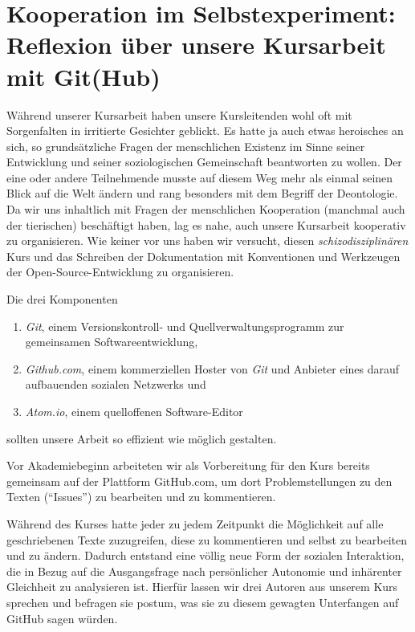 \section[Kursreflexion]{Kooperation im Selbstexperiment: Reflexion über unsere Kursarbeit mit Git(Hub)}

Während unserer Kursarbeit haben unsere Kursleitenden wohl oft mit Sorgenfalten in irritierte Gesichter geblickt.
Es hatte ja auch etwas heroisches an sich, so grundsätzliche Fragen der menschlichen Existenz im Sinne seiner Entwicklung und seiner soziologischen Gemeinschaft beantworten zu wollen.
Der eine oder andere Teilnehmende musste auf diesem Weg mehr als einmal seinen Blick auf die Welt ändern und rang besonders mit dem Begriff der Deontologie.
Da wir uns inhaltlich mit Fragen der menschlichen Kooperation (manchmal auch der tierischen) beschäftigt haben, lag es nahe, auch unsere Kursarbeit kooperativ zu organisieren.
Wie keiner vor uns haben wir versucht, diesen \emph{schizodisziplinären} Kurs und das Schreiben der Dokumentation mit Konventionen und Werkzeugen der Open-Source-Entwicklung zu organisieren.

Die drei Komponenten

\begin{enumerate}
	\item \emph{Git}, einem Versionskontroll- und Quellverwaltungsprogramm zur gemeinsamen Softwareentwicklung,
	\item \emph{Github.com}, einem kommerziellen Hoster von \emph{Git} und Anbieter eines darauf aufbauenden sozialen Netzwerks und
	\item \emph{Atom.io}, einem quelloffenen Software-Editor
\end{enumerate}

sollten unsere Arbeit so effizient wie möglich gestalten.

Vor Akademiebeginn arbeiteten wir als Vorbereitung für den Kurs bereits gemeinsam auf der Plattform GitHub.com, um dort Problemstellungen zu den Texten (``Issues'') zu bearbeiten und zu kommentieren.

Während des Kurses hatte jeder zu jedem Zeitpunkt die Möglichkeit auf alle geschriebenen Texte zuzugreifen, diese zu kommentieren und selbst zu bearbeiten und zu ändern.
Dadurch entstand eine völlig neue Form der sozialen Interaktion, die in Bezug auf die Ausgangsfrage nach persönlicher Autonomie und inhärenter Gleichheit zu analysieren ist.
Hierfür lassen wir drei Autoren aus unserem Kurs sprechen und befragen sie postum, was sie zu diesem gewagten Unterfangen auf GitHub sagen würden.



